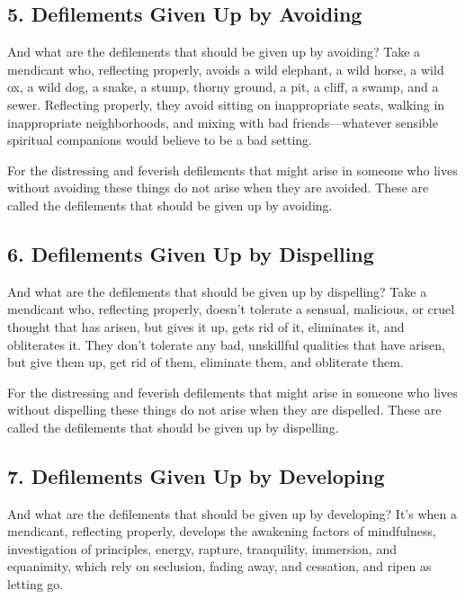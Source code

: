 \documentclass[12pt,openany]{book}%
\begin{document}
\subsection*{5. Defilements Given Up by Avoiding }

And what are the defilements that should be given up by avoiding? Take a mendicant who, reflecting properly, avoids a wild elephant, a wild horse, a wild ox, a wild dog, a snake, a stump, thorny ground, a pit, a cliff, a swamp, and a sewer. Reflecting properly, they avoid sitting on inappropriate seats, walking in inappropriate neighborhoods, and mixing with bad friends—whatever sensible spiritual companions would believe to be a bad setting. 

For the distressing and feverish defilements that might arise in someone who lives without avoiding these things do not arise when they are avoided. These are called the defilements that should be given up by avoiding. 

\subsection*{6. Defilements Given Up by Dispelling }

And what are the defilements that should be given up by dispelling? Take a mendicant who, reflecting properly, doesn’t tolerate a sensual, malicious, or cruel thought that has arisen, but gives it up, gets rid of it, eliminates it, and obliterates it. They don’t tolerate any bad, unskillful qualities that have arisen, but give them up, get rid of them, eliminate them, and obliterate them. 

For the distressing and feverish defilements that might arise in someone who lives without dispelling these things do not arise when they are dispelled. These are called the defilements that should be given up by dispelling. 

\subsection*{7. Defilements Given Up by Developing }

And what are the defilements that should be given up by developing? It’s when a mendicant, reflecting properly, develops the awakening factors of mindfulness, investigation of principles, energy, rapture, tranquility, immersion, and equanimity, which rely on seclusion, fading away, and cessation, and ripen as letting go. 
\end{document}
